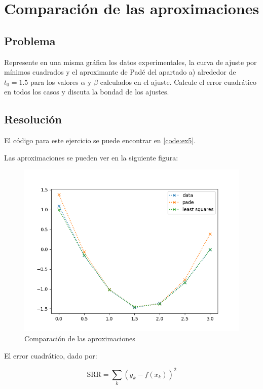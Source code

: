 \section{Comparación de las aproximaciones}

\subsection{Problema}

Represente en una misma gráfica los datos experimentales, la curva de ajuste por mínimos cuadrados y el aproximante de Padé del apartado a) alrededor de $t_0 = 1.5$ para los valores $\alpha$ y $\beta$ calculados en el ajuste. Calcule el error cuadrático en todos los casos y discuta la bondad de los ajustes.

\subsection{Resolución}

El código para este ejercicio se puede encontrar en \ref{code:ex5}.

Las aproximaciones se pueden ver en la siguiente figura:

\begin{figure}[H]
	\includegraphics[width=\linewidth]{figures/compare_approx.png}
	\caption{Comparación de las aproximaciones}
	\label{fig:compare_approx}
\end{figure}

El error cuadrático, dado por:


$$
\text{SRR} = \sum_{k} (y_k - f(x_k))^2 
$$

